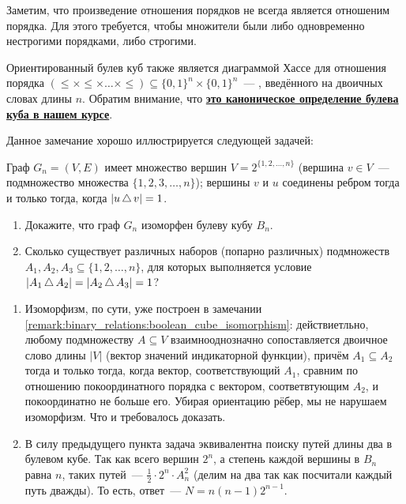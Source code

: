 Заметим, что произведение отношения порядков не всегда является отношеним порядка.
Для этого требуется, чтобы множители были либо одновременно нестрогими порядками, либо строгими.

\begin{remark}
    \label{remark:binary_relations:boolean_cube_isomorphism}
    Ориентированный булев куб также является диаграммой Хассе для отношения порядка
    $ (\leqslant \times \leqslant \times \ldots \times \leqslant) \subseteq \{ 0, 1 \}^n \times \{ 0, 1 \}^n $~---
    , введённого на двоичных словах длины $ n $.
    Обратим внимание, что \textbf{\uline{это каноническое определение булева куба в нашем курсе}}.
\end{remark}

Данное замечание хорошо иллюстрируется следующей задачей:
\begin{Exercise}[counter=SecExercise]
    \noindent
    Граф $ G_n = (V, E) $ имеет множество вершин $ V = 2^{\{1, 2, \ldots, n\}} $
    (вершина $ v \in V $~--- подмножество множества $ \{1, 2, 3, \ldots, n \} $);
    вершины $ v $ и $ u $ соединены ребром тогда и только тогда, когда $ | u \,\triangle\, v | = 1 $.
    \begin{enumerate}[label=\alph*)]
        \item
            Докажите, что граф $ G_n $ изоморфен булеву кубу $ B_n $.
        \item
            Сколько существует различных наборов (попарно различных) подмножеств $ A_1, A_2, A_3 \subseteq \{1, 2, \ldots, n\} $,
            для которых выполняется условие $ |A_1 \,\triangle\, A_2| = |A_2 \,\triangle\, A_3| = 1 $?
    \end{enumerate}
\end{Exercise}

\begin{Answer}
    \noindent
    \begin{enumerate}[label=\alph*)]
        \item
            Изоморфизм, по сути, уже построен в замечании \ref{remark:binary_relations:boolean_cube_isomorphism}:
            действиетльно, любому подмножеству $ A \subseteq V $ взаимнооднозначно сопоставляется двоичное слово длины $ |V| $ (вектор значений индикаторной функции),
            причём $ A_1 \subseteq A_2 $ тогда и только тогда, когда вектор, соответствующий $ A_1 $,
            сравним по отношению покоординатного порядка с вектором, соответвтующим $ A_2 $,
            и покоординатно не больше его.
            Убирая ориентацию рёбер, мы не нарушаем изоморфизм.
            Что и требовалось доказать.
        \item
            В силу предыдущего пункта задача эквивалентна поиску путей длины два в булевом кубе.
            Так как всего вершин $ 2^n $, а степень каждой вершины в $ B_n $ равна $ n $, таких путей~--- $ \frac{1}{2} \cdot 2^n \cdot A_n^2 $
            (делим на два так как посчитали каждый путь дважды).
            То есть, ответ~--- $ N = n (n-1) 2^{n-1} $.
    \end{enumerate}
\end{Answer}

